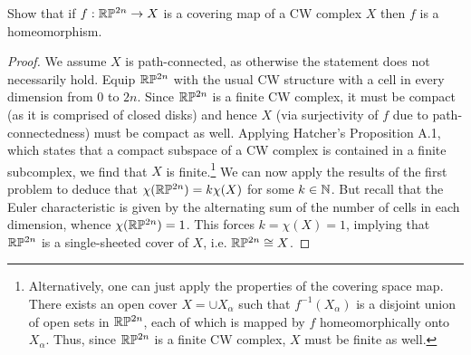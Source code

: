 \documentclass{../mathnotes}
\begin{document}
\begin{prop}
    Show that if $f:\mathbb{R}\mathbb{P}^{2n}\to X$ is a covering map of a CW complex $X$ then $f$ is a homeomorphism.
\end{prop}

\begin{proof}
    We assume $X$ is path-connected, as otherwise the statement does not necessarily hold.
    Equip $\mathbb{R}\mathbb{P}^{2n}$ with the usual CW structure with a cell in every dimension from $0$ to $2n$.
    Since $\mathbb{R}\mathbb{P}^{2n}$ is a finite CW complex, it must be compact
    (as it is comprised of closed disks) and hence $X$ (via surjectivity of $f$ due to path-connectedness)
    must be compact
    as well. Applying Hatcher's Proposition A.1, which states that a compact subspace of a CW complex
    is contained in a finite subcomplex, we find that $X$ is finite.\footnote{
        Alternatively, one can just apply the properties of the covering space map. There
        exists an open cover $X=\cup X_\alpha$ such that $f^{-1}(X_\alpha)$ is a disjoint union
        of open sets in $\mathbb{R}\mathbb{P}^{2n}$, each of which is mapped by $f$ homeomorphically onto $X_\alpha$.
        Thus, since $\mathbb{R}\mathbb{P}^{2n}$ is a finite CW complex, $X$ must be finite as well.
    }
    We can now apply
    the results of the first problem to deduce that $\chi(\mathbb{R}\mathbb{P}^{2n})=k\chi(X)$ for some $k\in\mathbb{N}$.
    But recall that the Euler characteristic is given by the alternating sum of the number of cells
    in each dimension, whence $\chi(\mathbb{R}\mathbb{P}^{2n})=1$. This forces $k=\chi(X)=1$, implying that $\mathbb{R}\mathbb{P}^{2n}$ is a
    single-sheeted cover of $X$, i.e. $\mathbb{R}\mathbb{P}^{2n}\cong X$.
\end{proof}
\end{document}
